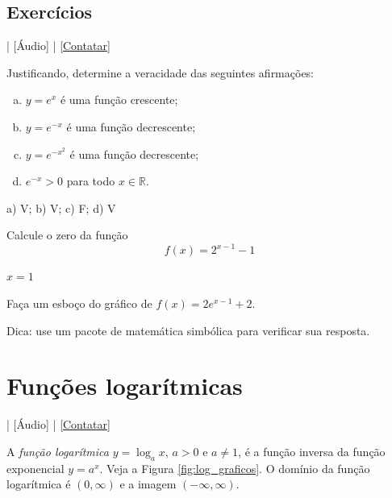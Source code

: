 \subsection*{Exercícios}

\begin{flushright}
  [Vídeo] | [Áudio] | \href{https://phkonzen.github.io/notas/contato.html}{[Contatar]}
\end{flushright}

\begin{exer}
  Justificando, determine a veracidade das seguintes afirmações:
  \begin{enumerate}[a)]
  \item $y=e^x$ é uma função crescente;
  \item $y=e^{-x}$ é uma função decrescente;
  \item $y=e^{-x^2}$ é uma função decrescente;
  \item $e^{-x}> 0$ para todo $x\in\mathbb{R}$. 
  \end{enumerate}
\end{exer}
\begin{resp}
  a) V; b) V; c) F; d) V
\end{resp}

\begin{exer}
  Calcule o zero da função
  \begin{equation}
    f(x) = 2^{x-1}-1
  \end{equation}
\end{exer}
\begin{resp}
  $x=1$
\end{resp}

\begin{exer}
  Faça um esboço do gráfico de $f(x) = 2e^{x-1}+2$.
\end{exer}
\begin{resp}
  Dica: use um pacote de matemática simbólica para verificar sua resposta.
\end{resp}

\section{Funções logarítmicas}\label{cap_funcao_sec_funlog}

\begin{flushright}
  [Vídeo] | [Áudio] | \href{https://phkonzen.github.io/notas/contato.html}{[Contatar]}
\end{flushright}

A \emph{função logarítmica} $y = \log_a x$, $a>0$ e $a\neq 1$, é a função inversa da função exponencial $y = a^x$. Veja a Figura \ref{fig:log_graficos}. O domínio da função logarítmica é $(0,\infty)$ e a imagem $(-\infty, \infty)$.

